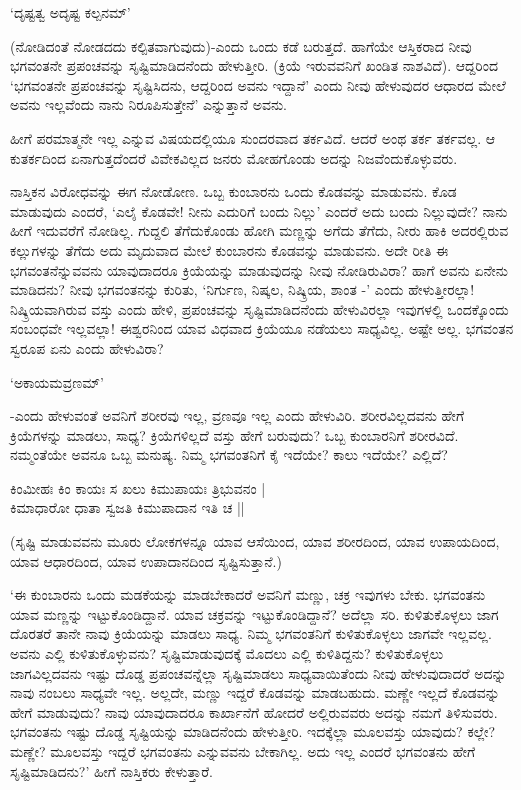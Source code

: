 \begin{shloka}
`ದೃಷ್ಟತ್ವ ಅದೃಷ್ಟ ಕಲ್ಪನಮ್'
\end{shloka}

(ನೋಡಿದಂತೆ ನೋಡದದು ಕಲ್ಪಿತವಾಗುವುದು)-ಎಂದು ಒಂದು ಕಡೆ ಬರುತ್ತದೆ. ಹಾಗೆಯೇ ಆಸ್ತಿಕರಾದ ನೀವು ಭಗವಂತನೇ ಪ್ರಪಂಚವನ್ನು ಸೃಷ್ಟಿಮಾಡಿದನೆಂದು ಹೇಳುತ್ತೀರಿ. (ಕ್ರಿಯೆ ಇರುವವನಿಗೆ ಖಂಡಿತ ನಾಶವಿದೆ). ಆದ್ದರಿಂದ `ಭಗವಂತನೇ ಪ್ರಪಂಚವನ್ನು ಸೃಷ್ಟಿಸಿದನು, ಆದ್ದರಿಂದ ಅವನು ಇದ್ದಾನೆ' ಎಂದು ನೀವು ಹೇಳುವುದರ ಆಧಾರದ ಮೇಲೆ ಅವನು ಇಲ್ಲವೆಂದು ನಾನು ನಿರೂಪಿಸುತ್ತೇನೆ' ಎನ್ನುತ್ತಾನೆ ಅವನು.

ಹೀಗೆ ಪರಮಾತ್ಮನೇ ಇಲ್ಲ ಎನ್ನುವ ವಿಷಯದಲ್ಲಿಯೂ ಸುಂದರವಾದ ತರ್ಕವಿದೆ. ಆದರೆ ಅಂಥ ತರ್ಕ ತರ್ಕವಲ್ಲ. ಆ ಕುತರ್ಕದಿಂದ ಏನಾಗುತ್ತದೆಂದರೆ ವಿವೇಕವಿಲ್ಲದ ಜನರು ಮೋಹಗೊಂಡು ಅದನ್ನು ನಿಜವೆಂದುಕೊಳ್ಳುವರು.

ನಾಸ್ತಿಕನ ವಿರೋಧವನ್ನು ಈಗ ನೋಡೋಣ. ಒಬ್ಬ ಕುಂಬಾರನು ಒಂದು ಕೊಡವನ್ನು ಮಾಡುವನು. ಕೊಡ ಮಾಡುವುದು ಎಂದರೆ, `ಎಲೈ ಕೊಡವೇ! ನೀನು ಎದುರಿಗೆ ಬಂದು ನಿಲ್ಲು' ಎಂದರೆ ಅದು ಬಂದು ನಿಲ್ಲುವುದೇ? ನಾನು ಹೀಗೆ ಇದುವರೆಗೆ ನೋಡಿಲ್ಲ. ಗುದ್ದಲಿ ತೆಗೆದುಕೊಂಡು ಹೋಗಿ ಮಣ್ಣನ್ನು ಅಗೆದು ತೆಗೆದು, ನೀರು ಹಾಕಿ ಅದರಲ್ಲಿರುವ ಕಲ್ಲುಗಳನ್ನು ತೆಗೆದು ಅದು ಮೃದುವಾದ ಮೇಲೆ ಕುಂಬಾರನು ಕೊಡವನ್ನು ಮಾಡುವನು. ಅದೇ ರೀತಿ ಈ ಭಗವಂತನೆನ್ನುವವನು ಯಾವುದಾದರೂ ಕ್ರಿಯೆಯನ್ನು ಮಾಡುವುದನ್ನು ನೀವು ನೋಡಿರುವಿರಾ? ಹಾಗೆ ಅವನು ಏನೇನು ಮಾಡಿದನು? ನೀವು ಭಗವಂತನನ್ನು ಕುರಿತು, `ನಿರ್ಗುಣ, ನಿಷ್ಕಲ, ನಿಷ್ಕ್ರಿಯ, ಶಾಂತ -' ಎಂದು ಹೇಳುತ್ತೀರಲ್ಲಾ! ನಿಷ್ಕ್ರಿಯವಾಗಿರುವ ವಸ್ತು ಎಂದು ಹೇಳಿ, ಪ್ರಪಂಚವನ್ನು ಸೃಷ್ಟಿಮಾಡಿದನೆಂದು ಹೇಳುವಿರಲ್ಲಾ ಇವುಗಳಲ್ಲಿ ಒಂದಕ್ಕೊಂದು ಸಂಬಂಧವೇ ಇಲ್ಲವಲ್ಲಾ! ಈಶ್ವರನಿಂದ ಯಾವ ವಿಧವಾದ ಕ್ರಿಯೆಯೂ ನಡೆಯಲು ಸಾಧ್ಯವಿಲ್ಲ. ಅಷ್ಟೇ ಅಲ್ಲ. ಭಗವಂತನ ಸ್ವರೂಪ ಏನು ಎಂದು ಹೇಳುವಿರಾ?


\begin{shloka}
`ಅಕಾಯಮವ್ರಣಮ್'
\end{shloka}

-ಎಂದು ಹೇಳುವಂತೆ ಅವನಿಗೆ ಶರೀರವು ಇಲ್ಲ, ವ್ರಣವೂ ಇಲ್ಲ ಎಂದು ಹೇಳುವಿರಿ. ಶರೀರವಿಲ್ಲದವನು ಹೇಗೆ ಕ್ರಿಯೆಗಳನ್ನು ಮಾಡಲು, ಸಾಧ್ಯ? ಕ್ರಿಯೆಗಳಿಲ್ಲದೆ ವಸ್ತು ಹೇಗೆ ಬರುವುದು? ಒಬ್ಬ ಕುಂಬಾರನಿಗೆ ಶರೀರವಿದೆ. ನಮ್ಮಂತೆಯೇ ಅವನೂ ಒಬ್ಬ ಮನುಷ್ಯ. ನಿಮ್ಮ ಭಗವಂತನಿಗೆ ಕೈ ಇದೆಯೇ? ಕಾಲು ಇದೆಯೇ? ಎಲ್ಲಿದೆ?

\begin{shloka}
ಕಿಂಮೀಹಃ ಕಿಂ ಕಾಯಃ ಸ ಖಲು ಕಿಮುಪಾಯಃ ತ್ರಿಭುವನಂ |\\
ಕಿಮಾಧಾರೋ ಧಾತಾ ಸ್ವಜತಿ ಕಿಮುಪಾದಾನ ಇತಿ ಚ ||
\end{shloka}

(ಸೃಷ್ಟಿ ಮಾಡುವವನು ಮೂರು ಲೋಕಗಳನ್ನೂ ಯಾವ ಆಸೆಯಿಂದ, ಯಾವ ಶರೀರದಿಂದ, ಯಾವ ಉಪಾಯದಿಂದ, ಯಾವ ಆಧಾರದಿಂದ, ಯಾವ ಉಪಾದಾನದಿಂದ ಸೃಷ್ಟಿಸುತ್ತಾನೆ.)

`ಈ ಕುಂಬಾರನು ಒಂದು ಮಡಕೆಯನ್ನು ಮಾಡಬೇಕಾದರೆ ಅವನಿಗೆ ಮಣ್ಣು, ಚಕ್ರ ಇವುಗಳು ಬೇಕು. ಭಗವಂತನು ಯಾವ ಮಣ್ಣನ್ನು ಇಟ್ಟುಕೊಂಡಿದ್ದಾನೆ. ಯಾವ ಚಕ್ರವನ್ನು ಇಟ್ಟುಕೊಂಡಿದ್ದಾನೆ? ಅದೆಲ್ಲಾ ಸರಿ. ಕುಳಿತುಕೊಳ್ಳಲು ಜಾಗ ದೊರತರೆ ತಾನೇ ನಾವು ಕ್ರಿಯೆಯನ್ನು ಮಾಡಲು ಸಾಧ್ಯ. ನಿಮ್ಮ ಭಗವಂತನಿಗೆ ಕುಳಿತುಕೊಳ್ಳಲು ಜಾಗವೇ ಇಲ್ಲವಲ್ಲ. ಅವನು ಎಲ್ಲಿ ಕುಳಿತುಕೊಳ್ಳುವನು? ಸೃಷ್ಟಿಮಾಡುವುದಕ್ಕೆ ಮೊದಲು ಎಲ್ಲಿ ಕುಳಿತಿದ್ದನು? ಕುಳಿತುಕೊಳ್ಳಲು ಜಾಗವಿಲ್ಲದವನು ಇಷ್ಟು ದೊಡ್ಡ ಪ್ರಪಂಚವನ್ನೆಲ್ಲಾ ಸೃಷ್ಟಿಮಾಡಲು ಸಾಧ್ಯವಾಯಿತೆಂದು ನೀವು ಹೇಳುವುದಾದರೆ ಅದನ್ನು ನಾವು ನಂಬಲು ಸಾಧ್ಯವೇ ಇಲ್ಲ. ಅಲ್ಲದೇ, ಮಣ್ಣು ಇದ್ದರೆ ಕೊಡವನ್ನು ಮಾಡಬಹುದು. ಮಣ್ಣೇ ಇಲ್ಲದೆ ಕೊಡವನ್ನು ಹೇಗೆ ಮಾಡುವುದು? ನಾವು ಯಾವುದಾದರೂ ಕಾರ್ಖಾನೆಗೆ ಹೋದರೆ ಅಲ್ಲಿರುವವರು ಅದನ್ನು ನಮಗೆ ತಿಳಿಸುವರು. ಭಗವಂತನು ಇಷ್ಟು ದೊಡ್ಡ ಸೃಷ್ಟಿಯನ್ನು ಮಾಡಿದನೆಂದು ಹೇಳುತ್ತೀರಿ. ಇದಕ್ಕೆಲ್ಲಾ ಮೂಲವಸ್ತು ಯಾವುದು? ಕಲ್ಲೇ? ಮಣ್ಣೇ? ಮೂಲವಸ್ತು ಇದ್ದರೆ ಭಗವಂತನು ಎನ್ನುವವನು ಬೇಕಾಗಿಲ್ಲ. ಅದು ಇಲ್ಲ ಎಂದರೆ ಭಗವಂತನು ಹೇಗೆ ಸೃಷ್ಟಿಮಾಡಿದನು?' ಹೀಗೆ ನಾಸ್ತಿಕರು ಕೇಳುತ್ತಾರೆ.

